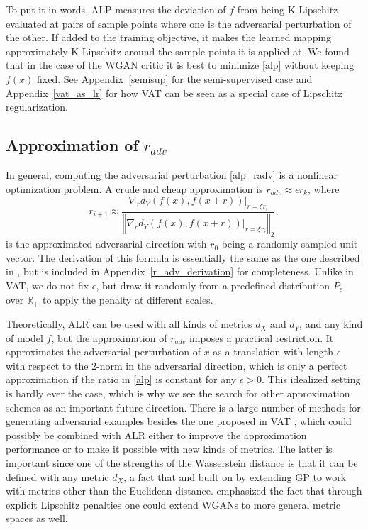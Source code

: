 \documentclass{article}
\begin{document}
To put it in words, ALP measures the deviation of $f$ from being K-Lipschitz evaluated at pairs of sample points where one is the adversarial perturbation of the other. If added to the training objective, it makes the learned mapping approximately K-Lipschitz around the sample points it is applied at. We found that in the case of the WGAN critic it is best to minimize \eqref{alp} without keeping $f(x)$ fixed. See Appendix~\ref{semisup} for the semi-supervised case and Appendix~\ref{vat_as_lr} for how VAT can be seen as a special case of Lipschitz regularization.

\subsection{Approximation of $r_{adv}$}
In general, computing the adversarial perturbation \eqref{alp_radv} is a nonlinear optimization problem. A crude and cheap approximation is $r_{adv}\approx\epsilon r_k$, where
\begin{equation} \label{advdir}
r_{i+1} \approx \frac{
\nabla_r d_Y\left(f(x),f(x+r)\right)\Big\vert_{r=\xi r_i}
}{
\left\Vert \nabla_rd_Y\left(f(x),f(x+r)\right)\Big\vert_{r=\xi r_i} \right\Vert_2
},
\end{equation}
is the approximated adversarial direction with $r_0$ being a randomly sampled unit vector. The derivation of this formula is essentially the same as the one described in \citet{Miyatoetal2017}, but is included in Appendix~\ref{r_adv_derivation} for completeness. Unlike in VAT, we do not fix $\epsilon$, but draw it randomly from a predefined distribution $P_{\epsilon}$ over $\mathbb{R}_+$ to apply the penalty at different scales.

Theoretically, ALR can be used with all kinds of metrics $d_X$ and $d_Y$, and any kind of model $f$, but the approximation of $r_{adv}$ imposes a practical restriction. It approximates the adversarial perturbation of $x$ as a translation with length $\epsilon$ with respect to the $2$-norm in the adversarial direction, which is only a perfect approximation if the ratio in \eqref{alp} is constant for any $\epsilon>0$. This idealized setting is hardly ever the case, which is why we see the search for other approximation schemes as an important future direction. There is a large number of methods for generating adversarial examples besides the one proposed in VAT \citep{Shafahietal2019, Wongetal2019, Khrulkovetal2018}, which could possibly be combined with ALR either to improve the approximation performance or to make it possible with new kinds of metrics. The latter is important since one of the strengths of the Wasserstein distance is that it can be defined with any metric $d_X$, a fact that \citet{Adleretal2018} and \citet{Dukleretal2019} built on by extending GP to work with metrics other than the Euclidean distance. \citet{Adleretal2018} emphasized the fact that through explicit Lipschitz penalties one could extend WGANs to more general metric spaces as well.
\end{document}
